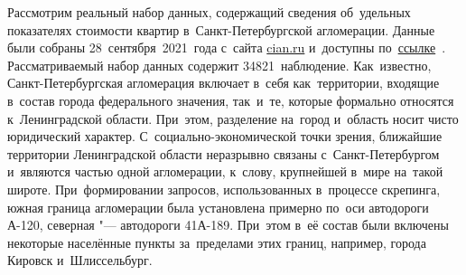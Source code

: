 \documentclass[]{scrartcl}
\begin{document}
Рассмотрим реальный набор данных, содержащий сведения об~удельных показателях стоимости квартир в~Санкт-Петербургской агломерации. Данные были собраны 28~сентября~2021~года с~сайта \href{https://www.cian.ru/}{cian.ru} и~доступны по~\href{https://github.com/Kirill-Murashev/datasets/blob/main/Saint-Petersburg/flats/spba_flats_210928.csv}{ссылке}~\cite{ds:spba-flats-210928}. Рассматриваемый набор данных содержит 34821~наблюдение. Как~известно, Санкт-Петербургская агломерация включает в~себя как~территории, входящие в~состав города федерального значения, так~и~те, которые формально относятся к~Ленинградской области. При~этом, разделение на~город и~область носит чисто юридический характер. С~социально-экономической точки зрения, ближайшие территории Ленинградской области неразрывно связаны с~Санкт-Петербургом и~являются частью одной агломерации, к~слову, крупнейшей в~мире на~такой широте. При~формировании запросов, использованных в~процессе скрепинга, южная граница агломерации была установлена примерно по~оси автодороги А-120, северная "--- автодороги 41А-189. При~этом в~её состав были включены некоторые населённые пункты за~пределами этих границ, например, города Кировск и~Шлиссельбург.
\end{document}

